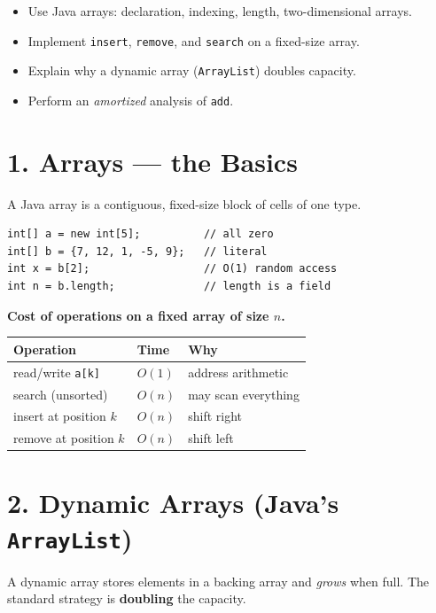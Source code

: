 \documentclass[11pt]{article}
\begin{document}

\begin{objbox}
\begin{itemize}[leftmargin=*]
  \item Use Java arrays: declaration, indexing, length, two-dimensional arrays.
  \item Implement \texttt{insert}, \texttt{remove}, and \texttt{search} on a fixed-size array.
  \item Explain why a dynamic array (\texttt{ArrayList}) doubles capacity.
  \item Perform an \emph{amortized} analysis of \texttt{add}.
\end{itemize}
\end{objbox}

\section*{1. Arrays --- the Basics}

A Java array is a contiguous, fixed-size block of cells of one type.
\begin{lstlisting}
int[] a = new int[5];          // all zero
int[] b = {7, 12, 1, -5, 9};   // literal
int x = b[2];                  // O(1) random access
int n = b.length;              // length is a field
\end{lstlisting}

\textbf{Cost of operations on a fixed array of size $n$.}
\begin{center}
\begin{tabular}{lll}
\textbf{Operation} & \textbf{Time} & \textbf{Why} \\
\hline
read/write \texttt{a[k]}  & $O(1)$ & address arithmetic \\
search (unsorted)         & $O(n)$ & may scan everything \\
insert at position $k$    & $O(n)$ & shift right \\
remove at position $k$    & $O(n)$ & shift left \\
\end{tabular}
\end{center}

\section*{2. Dynamic Arrays (Java's \texttt{ArrayList})}

A dynamic array stores elements in a backing array and \emph{grows} when full. The standard strategy is \textbf{doubling} the capacity.
\end{document}
